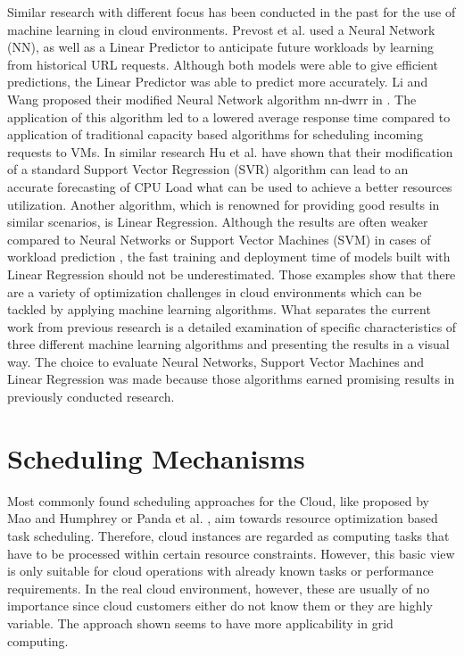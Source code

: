 Similar research with different focus has been conducted in the past for the use of machine learning in cloud environments. Prevost et al. used a Neural Network (NN), as well as a Linear Predictor \cite{prevost2011prediction} to anticipate future workloads by learning from historical URL requests. Although both models were able to give efficient predictions, the Linear Predictor was able to predict more accurately. Li and Wang proposed their modified Neural Network algorithm nn-dwrr in \cite{li2014sla}. The application of this algorithm led to a lowered average response time compared to application of traditional capacity based algorithms for scheduling incoming requests to VMs. In similar research Hu et al. \cite{hu2013kswsvr} have shown that their modification of a standard Support Vector Regression (SVR) algorithm can lead to an accurate forecasting of CPU Load what can be used to achieve a better resources utilization. Another algorithm, which is renowned for providing good results in similar scenarios, is Linear Regression. Although the results are often weaker compared to Neural Networks or Support Vector Machines (SVM) in cases of workload prediction \cite{bankole2013predicting} \cite{imam2011neural}, the fast training and deployment time of models built with Linear Regression should not be underestimated. Those examples show that there are a variety of optimization challenges in cloud environments which can be tackled by applying machine learning algorithms. What separates the current work from previous research is a detailed examination of specific characteristics of three different machine learning algorithms and presenting the results in a visual way. The choice to evaluate Neural Networks, Support Vector Machines and Linear Regression was made because those algorithms earned promising results in previously conducted research.


\section{Scheduling Mechanisms}

Most commonly found scheduling approaches for the Cloud, like proposed by Mao and Humphrey \cite{6114435} or Panda et al. \cite{PANDA2015176}, aim towards resource optimization based task scheduling. Therefore, cloud instances are regarded as computing tasks that have to be processed within certain resource constraints. However, this basic view is only suitable for cloud operations with already known tasks or performance requirements. In the real cloud environment, however, these are usually of no importance since cloud customers either do not know them or they are highly variable. The approach shown seems to have more applicability in grid computing.


